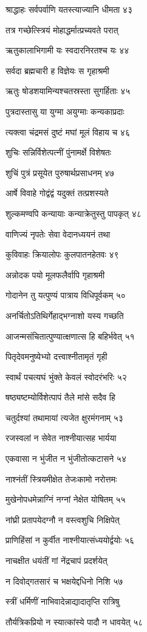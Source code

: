 श्राद्धाहः सर्वपर्वाणि यतस्त्याज्यानि धीमता ४३

तत्र गच्छेत्स्त्रियं मोहाद्धर्मात्प्रच्यवते परात्

ऋतुकालाभिगामी यः स्वदारनिरतश्च यः ४४

सर्वदा ब्रह्मचारी ह विज्ञेयः स गृहाश्रमी

ऋतुः षोडशयामिन्यश्चतस्रस्ता सुगर्हिताः ४५

पुत्रदास्तासु या युग्मा अयुग्माः कन्यकाप्रदाः

त्यक्त्वा चंद्रमसं दुष्टं मघां मूलं विहाय च ४६

शुचिः सन्निर्विशेत्पत्नीं पुंनामर्क्षे विशेषतः

शुचिं पुत्रं प्रसूयेत पुरुषार्थप्रसाधनम् ४७

आर्षे विवाहे गोद्वंद्वं यदुक्तं तत्प्रशस्यते

शुल्कमण्वपि कन्यायाः कन्याक्रेतुस्तु पापकृत् ४८

वाणिज्यं नृपतेः सेवा वेदानध्ययनं तथा

कुविवाहः क्रियालोपः कुलपातनहेतवः ४९

अन्नोदक पयो मूलफलैर्वापि गृहाश्रमी

गोदानेन तु यत्पुण्यं पात्राय विधिपूर्वकम् ५०

अनर्चितोऽतिथिर्गेहाद्भग्नाशो यस्य गच्छति

आजन्मसंचितात्पुण्यात्क्षणात्स हि बहिर्भवेत् ५१

पितृदेवमनुष्येभ्यो दत्त्वाश्नीतामृतं गृही

स्वार्थं पचत्यघं भुंक्ते केवलं स्वोदरंभरिः ५२

षष्ठ्यष्टम्योर्विशेत्पापं तैले मांसे सदैव हि

चतुर्दश्यां तथामायां त्यजेत क्षुरमंगनाम् ५३

रजस्वलां न सेवेत नाश्नीयात्सह भार्यया

एकवासा न भुंजीत न भुंजीतोत्कटासने ५४

नाश्नंतीं स्त्रियमीक्षेत तेजःकामो नरोत्तमः

मुखेनोपधमेन्नाग्निं नग्नां नेक्षेत योषितम् ५५

नांघ्री प्रतापयेदग्नौ न वस्त्वशुचि निक्षिपेत्

प्राणिहिंसां न कुर्वीत नाश्नीयात्संध्ययोर्द्वयोः ५६

नाचक्षीत धयंतीं गां नेंद्रचापं प्रदर्शयेत्

न दिवोद्गतसारं च भक्षयेद्दधिनो निशि ५७

स्त्रीं धर्मिणीं नाभिवादेन्नाद्यादातृप्ति रात्रिषु

तौर्यत्रिकप्रियो न स्यात्कांस्ये पादौ न धावयेत् ५८

